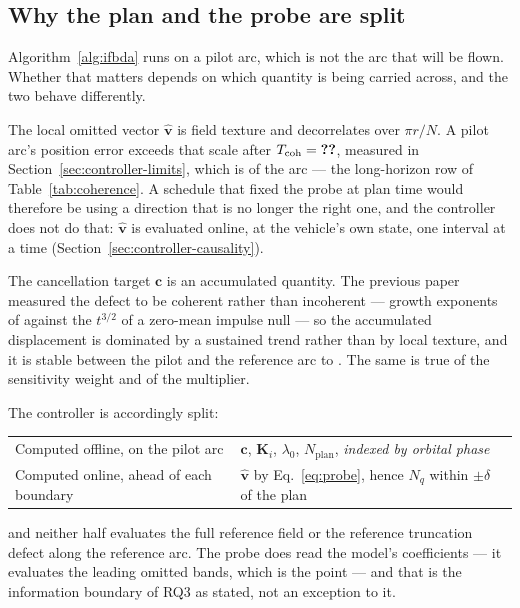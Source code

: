 \subsection{Why the plan and the probe are split}
\label{sec:controller-split}

Algorithm~\ref{alg:ifbda} runs on a pilot arc, which is not the arc that will
be flown. Whether that matters depends on which quantity is being carried
across, and the two behave differently.

The local omitted vector $\hat{\mathbf v}$ is field texture and decorrelates
over $\pi r/N$. A pilot arc's position error exceeds that scale after
$T_{\mathrm{coh}}=\ph{value}$, measured in Section~\ref{sec:controller-limits},
which is  of the arc --- the long-horizon row of
Table~\ref{tab:coherence}. A schedule that fixed the probe at plan time would
therefore be using a direction that is no longer the right one, and the
controller does not do that: $\hat{\mathbf v}$ is evaluated online, at the
vehicle's own state, one interval at a time
(Section~\ref{sec:controller-causality}).

The cancellation target $\mathbf c$ is an accumulated quantity. The previous
paper measured the defect to be coherent rather than incoherent --- growth
exponents of  against the $t^{3/2}$ of a zero-mean impulse null ---
so the accumulated displacement is dominated by a sustained trend rather than
by local texture, and it is stable between the pilot and the reference arc to
 . The same is true of the sensitivity weight and of the
multiplier.

The controller is accordingly split:

\begin{center}
\begin{tabular}{@{}ll@{}}
  \toprule
  Computed offline, on the pilot arc & $\mathbf c$, $\mathbf K_i$, $\lambda_0$,
    $N_{\mathrm{plan}}$, \emph{indexed by orbital phase} \\
  Computed online, ahead of each boundary & $\hat{\mathbf v}$ by
    Eq.~\eqref{eq:probe}, hence $N_q$ within $\pm\delta$ of the plan \\
  \bottomrule
\end{tabular}
\end{center}

and neither half evaluates the full reference field or the reference truncation
defect along the reference arc. The probe does read the model's coefficients ---
it evaluates the leading omitted bands, which is the point --- and that is the
information boundary of RQ3 as stated, not an exception to it.

